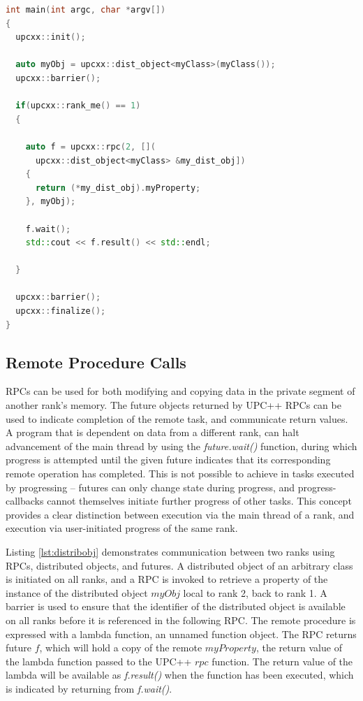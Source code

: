 \documentclass{uit-report}
\begin{document}
\begin{lstlisting}[label={lst:distribobj}, float=t,frame=tlrb, caption={Communication through RPC, referencing a distributed object of an arbitrary C++ class. Rank 1 retrieves and prints \emph{myProperty} from rank 2's instance of \emph{myObj}.}, captionpos=b, language=c++, showstringspaces=false]
int main(int argc, char *argv[])
{
  upcxx::init();

  auto myObj = upcxx::dist_object<myClass>(myClass());
  upcxx::barrier();

  if(upcxx::rank_me() == 1)
  {
  
    auto f = upcxx::rpc(2, [](
      upcxx::dist_object<myClass> &my_dist_obj])
    {
      return (*my_dist_obj).myProperty;
    }, myObj);

    f.wait();
    std::cout << f.result() << std::endl;
    
  }

  upcxx::barrier();
  upcxx::finalize();
} 
\end{lstlisting}

\subsection{Remote Procedure Calls}

RPCs can be used for both modifying and copying data in the private segment of another rank's memory. The future objects returned by UPC++ RPCs can be used to indicate completion of the remote task, and communicate return values. A program that is dependent on data from a different rank, can halt advancement of the main thread by using the \emph{future.wait()} function, during which progress is attempted until the given future indicates that its corresponding remote operation has completed. This is not possible to achieve in tasks executed by progressing -- futures can only change state during progress, and progress-callbacks cannot themselves initiate further progress of other tasks. This concept provides a clear distinction between execution via the main thread of a rank, and execution via user-initiated progress of the same rank.

Listing \ref{lst:distribobj} demonstrates communication between two ranks using RPCs, distributed objects, and futures. A distributed object of an arbitrary class is initiated on all ranks, and a RPC is invoked to retrieve a property of the instance of the distributed object $myObj$ local to rank 2, back to rank 1. A barrier is used to ensure that the identifier of the distributed object is available on all ranks before it is referenced in the following RPC. The remote procedure is expressed with a lambda function, an unnamed function object. The RPC returns future $f$, which will hold a copy of the remote $myProperty$, the return value of the lambda function passed to the UPC++ $rpc$ function. The return value of the lambda will be available as \emph{f.result()} when the function has been executed, which is indicated by returning from \emph{f.wait()}. 
\end{document}

